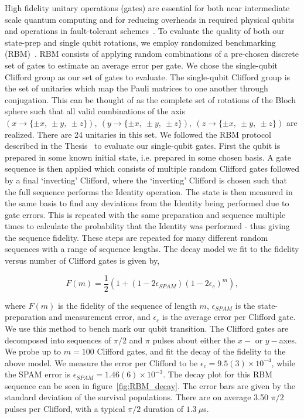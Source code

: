     High fidelity unitary operations (gates) are essential for both near
    intermediate scale quantum computing and for reducing overheads in required
    physical qubits and operations in fault-tolerant
    schemes~\cite{steane_overhead_2003}. To evaluate the quality of both our
    state-prep and single qubit rotations, we employ randomized benchmarking
    (RBM)~\cite{knill_randomized_2008, magesan_scalable_2011}.  RBM consists of
    applying random combinations of a pre-chosen discrete set of gates to
    estimate an average error per gate.  We chose the single-qubit Clifford
    group as our set of gates to evaluate. The single-qubit Clifford group is
    the set of unitaries which map the Pauli matrices to one another through
    conjugation. This can be thought of as the complete set of rotations of the
    Bloch sphere such that all valid combinations of the axis $(x \rightarrow
    \{\pm x,~\pm y,~\pm z\}),~(y \rightarrow \{\pm x,~\pm y,~\pm z\}),~(z
    \rightarrow \{\pm x,~\pm y,~\pm z\})$ are realized. There are 24 unitaries
    in this set. We followed the RBM protocol described in the
    Thesis~\cite{hughes_benchmarking_2021} to evaluate our single-qubit gates.
    First the qubit is prepared in some known initial state, i.e. prepared in
    some chosen basis. A gate sequence is then applied which consists of
    multiple random Clifford gates followed by a final `inverting' Clifford,
    where the `inverting' Clifford is chosen such that the full sequence
    performs the Identity operation. The state is then measured in the same
    basis to find any deviations from the Identity being performed due to gate
    errors. This is repeated with the same preparation and sequence multiple
    times to calculate the probability that the Identity was performed - thus
    giving the sequence fidelity. These steps are repeated for many different
    random sequences with a range of sequence lengths. The decay model we fit to
    the fidelity versus number of Clifford gates is given by,

    \begin{equation}
        F(m) = \frac{1}{2}\left( 1+(1-2\epsilon_{SPAM})(1-2\epsilon_c)^m\right),
    \end{equation}

    \noindent where $F(m)$ is the fidelity of the sequence of length $m$,
    $\epsilon_{SPAM}$ is the state-preparation and measurement error, and
    $\epsilon_c$ is the average error per Clifford gate.  We use this method to
    bench mark our qubit transition. The Clifford gates are decomposed into
    sequences of $\pi/2$ and $\pi$ pulses about either the $x-$ or $y-$axes. We probe up to $m=100$ Clifford gates, and fit the decay of the fidelity to the above model.
    We measure the error per Clifford to be $\epsilon_c = 9.5(3) \times 10^{-4}$,
    while the SPAM error is $\epsilon_{SPAM} = 1.46(6) \times 10^{-3}$. The decay plot for
    this RBM sequence can be seen in figure~\ref{fig:RBM_decay}. The error bars
    are given by the standard deviation of the survival populations. There are on average 3.50 $\pi/2$ pulses per Clifford, with a typical $\pi/2$ duration of $1.3~\mu$s.\\


